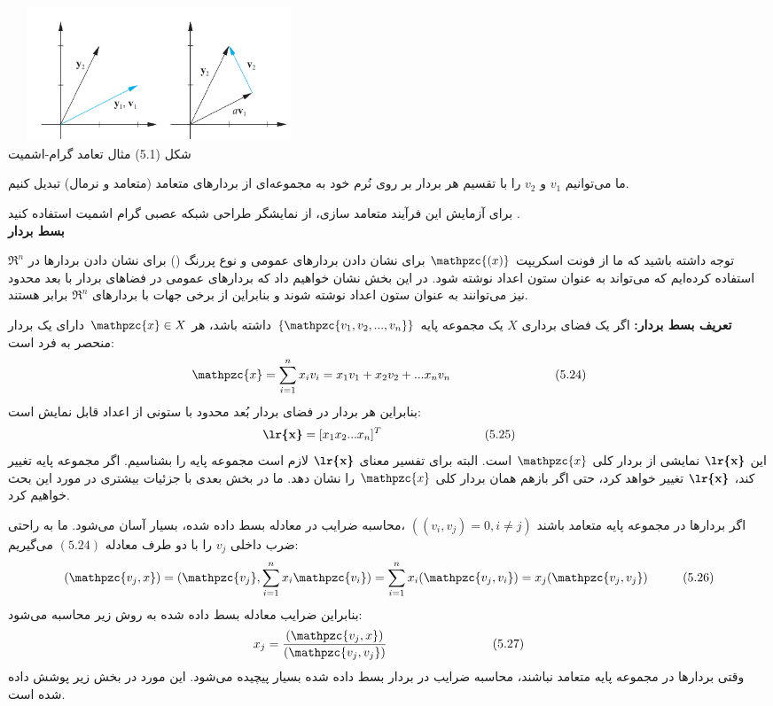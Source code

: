 \documentclass[a4paper,12pt]{report}
\begin{document}
	
	\begin{center}
		\includegraphics[width=9cm, height=4cm]{130-1}\\
		شکل (5.1) مثال تعامد گرام-اشمیت
	\end{center}
	
	ما می‌توانیم $ v_1 $ و $ v_2 $ را با تقسیم هر بردار بر روی نُرم خود به مجموعه‌ای از بردارهای متعامد (متعامد و نرمال) تبدیل کنیم.

	برای آزمایش این فرآیند متعامد سازی، از نمایشگر طراحی شبکه عصبی گرام اشمیت استفاده کنید \textbf{}.\\
	
	\noindent\textbf{\Large بسط بردار}
	
	توجه داشته باشید که ما از فونت اسکریپت $ \mathpzc{(x)} $ برای نشان دادن بردارهای عمومی و نوع پررنگ (\textbf{}) برای نشان دادن بردارها در $ \Re^n $ استفاده کرده‌ایم که می‌تواند به عنوان ستون اعداد نوشته شود. در این بخش نشان خواهیم داد که بردارهای عمومی در فضاهای بردار با بعد محدود نیز می‌توانند به عنوان ستون اعداد نوشته شوند و بنابراین از برخی جهات با بردارهای $ \Re^n $ برابر هستند.
	
	\textbf{تعریف بسط بردار:}
	اگر یک فضای برداری $ X $ یک مجموعه پایه
	 $ \{\mathpzc{v_1,v_2,...,v_n}\} $
	  داشته باشد، هر 
	 $ \mathpzc{x} \in X $
	  دارای یک بردار منحصر به فرد است:
	  $$
	  \mathpzc{x}=\sum_{i=1}^{n}x_iv_i=x_1v_1+x_2v_2+...x_nv_n \hspace{3cm} (5.24)
	  $$
	  بنابراین هر بردار در فضای بردار بُعد محدود با ستونی از اعداد قابل نمایش است:
	  $$
	  \textbf{\lr{x}}=[x_1x_2...x_n]^T \hspace{3cm} (5.25)
	  $$
	  این $ \textbf{\lr{x}} $ نمایشی از بردار کلی $ \mathpzc{x} $ است.
	  البته برای تفسیر معنای $ \textbf{\lr{x}} $ لازم است مجموعه پایه را بشناسیم. اگر مجموعه پایه تغییر کند، $ \textbf{\lr{x}} $ تغییر خواهد کرد، حتی اگر بازهم همان بردار کلی $ \mathpzc{x} $ را نشان دهد. ما در بخش بعدی با جزئیات بیشتری در مورد این بحث خواهیم کرد.
	  
	  اگر بردارها در مجموعه پایه متعامد باشند
	  $ ((v_i,v_j)=0, i \neq j) $
	  ،محاسبه ضرایب در معادله بسط داده شده، بسیار آسان می‌شود. ما به راحتی ضرب داخلی $ v_j $ را با دو طرف معادله $ (5.24) $ می‌گیریم:
	  $$
	  (\mathpzc{v_j,x}) = (\mathpzc{v_j},\sum_{i=1}^{n}x_i\mathpzc{v_i}) = 
	  \sum_{i=1}^{n}x_i(\mathpzc{v_j,v_i}) = x_j(\mathpzc{v_j,v_j}) \hspace{1cm} (5.26)
	  $$
	  بنابراین ضرایب معادله بسط داده شده به روش زیر محاسبه می‌شود:
	  $$
	  x_j=\frac{(\mathpzc{v_j,x})}{(\mathpzc{v_j,v_j})} \hspace{3cm} (5.27)
	  $$
	  وقتی بردارها در مجموعه پایه متعامد نباشند، محاسبه ضرایب در بردار بسط داده شده بسیار پیچیده می‌شود. این مورد در بخش زیر پوشش داده شده است.\vspace{5cm}
	  
\end{document}
